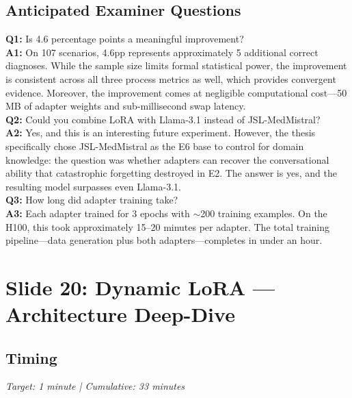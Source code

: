 \documentclass[12pt]{article}
\begin{document}
  \subsection*{Anticipated Examiner Questions}
  \begin{qabox}
  \textbf{Q1:} Is 4.6 percentage points a meaningful improvement? \\
  \textbf{A1:} On 107 scenarios, 4.6pp represents approximately 5 additional correct diagnoses. While the sample size limits formal statistical power, the improvement is consistent across all three process metrics as well, which provides convergent evidence. Moreover, the improvement comes at negligible computational cost---50 MB of adapter weights and sub-millisecond swap latency. \\[6pt]
  \textbf{Q2:} Could you combine LoRA with Llama-3.1 instead of JSL-MedMistral? \\
  \textbf{A2:} Yes, and this is an interesting future experiment. However, the thesis specifically chose JSL-MedMistral as the E6 base to control for domain knowledge: the question was whether adapters can recover the conversational ability that catastrophic forgetting destroyed in E2. The answer is yes, and the resulting model surpasses even Llama-3.1. \\[6pt]
  \textbf{Q3:} How long did adapter training take? \\
  \textbf{A3:} Each adapter trained for 3 epochs with $\sim$200 training examples. On the H100, this took approximately 15--20 minutes per adapter. The total training pipeline---data generation plus both adapters---completes in under an hour.
  \end{qabox}



  \section{Slide 20: Dynamic LoRA --- Architecture Deep-Dive}

  \subsection*{Timing}
  \textit{Target: 1 minute | Cumulative: 33 minutes}
\end{document}
